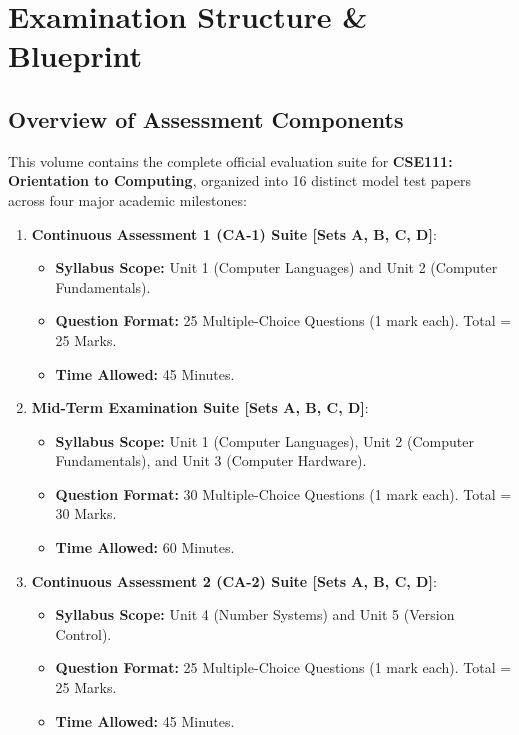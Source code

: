 \chapter*{Examination Structure \& Blueprint}
\label{chap:exam_instructions}

\section*{Overview of Assessment Components}
This volume contains the complete official evaluation suite for \textbf{CSE111: Orientation to Computing}, organized into 16 distinct model test papers across four major academic milestones:

\begin{enumerate}[leftmargin=8mm, label=\textbf{\Roman*.}]
    \item \textbf{Continuous Assessment 1 (CA-1) Suite [Sets A, B, C, D]}:
    \begin{itemize}[leftmargin=6mm]
        \item \textbf{Syllabus Scope:} Unit 1 (Computer Languages) and Unit 2 (Computer Fundamentals).
        \item \textbf{Question Format:} 25 Multiple-Choice Questions (1 mark each). Total = 25 Marks.
        \item \textbf{Time Allowed:} 45 Minutes.
    \end{itemize}

    \item \textbf{Mid-Term Examination Suite [Sets A, B, C, D]}:
    \begin{itemize}[leftmargin=6mm]
        \item \textbf{Syllabus Scope:} Unit 1 (Computer Languages), Unit 2 (Computer Fundamentals), and Unit 3 (Computer Hardware).
        \item \textbf{Question Format:} 30 Multiple-Choice Questions (1 mark each). Total = 30 Marks.
        \item \textbf{Time Allowed:} 60 Minutes.
    \end{itemize}

    \item \textbf{Continuous Assessment 2 (CA-2) Suite [Sets A, B, C, D]}:
    \begin{itemize}[leftmargin=6mm]
        \item \textbf{Syllabus Scope:} Unit 4 (Number Systems) and Unit 5 (Version Control).
        \item \textbf{Question Format:} 25 Multiple-Choice Questions (1 mark each). Total = 25 Marks.
        \item \textbf{Time Allowed:} 45 Minutes.
    \end{itemize}


\end{enumerate}
